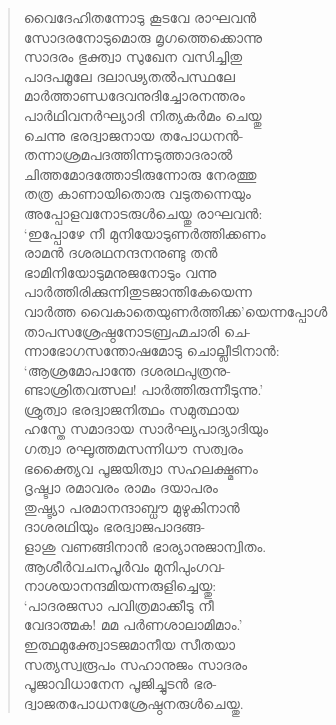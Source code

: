 \begin{verse}
വൈദേഹിതന്നോടു കൂടവേ രാഘവന്‍\\
സോദരനോടുമൊരു മൃഗത്തെക്കൊന്നു\\
സാദരം ഭുക്ത്വാ സുഖേന വസിച്ചിതു\\
പാദപമൂലേ ദലാഢ്യതല്‍പസ്ഥലേ\\
മാര്‍ത്താണ്ഡദേവനുദിച്ചോരനന്തരം\\
പാര്‍ഥിവനര്‍ഘ്യാദി നിത്യകര്‍മം ചെയ്തു\\
ചെന്നു ഭരദ്വാജനായ തപോധനന്‍-\\
തന്നാശ്രമപദത്തിന്നടുത്താദരാല്‍\\
ചിത്തമോദത്തോടിരുന്നോരു നേരത്തു\\
തത്ര കാണായിതൊരു വടുതന്നെയും\\
അപ്പോളവനോടരുള്‍ചെയ്തു രാഘവന്‍:\\
‘ഇപ്പോഴേ നീ മുനിയോടുണര്‍ത്തിക്കണം\\
രാമന്‍ ദശരഥനന്ദനനുണ്ടു തന്‍\\
ഭാമിനിയോടുമനുജനോടും വന്നു\\
പാര്‍ത്തിരിക്കുന്നിതുടജാന്തികേയെന്ന\\
വാര്‍ത്ത വൈകാതെയുണര്‍ത്തിക്ക’യെന്നപ്പോള്‍\\
താപസശ്രേഷ്ഠനോടബ്രഹ്മചാരി ചെ-\\
ന്നാഭോഗസന്തോഷമോടു ചൊല്ലീടിനാന്‍:\\
‘ആശ്രമോപാന്തേ ദശരഥപുത്രനു-\\
ണ്ടാശ്രിതവത്സല! പാര്‍ത്തിരുന്നീടുന്നു.’\\
ശ്രുത്വാ ഭരദ്വാജനിത്ഥം സമുത്ഥായ\\
ഹസ്തേ സമാദായ സാര്‍ഘ്യപാദ്യാദിയും\\
ഗത്വാ രഘൂത്തമസന്നിധൗ സത്വരം\\
ഭക്ത്യൈവ പൂജയിത്വാ സഹലക്ഷ്മണം\\
ദൃഷ്ട്വാ രമാവരം രാമം ദയാപരം\\
തുഷ്ട്യാ പരമാനന്ദാബ്ധൗ മുഴുകിനാന്‍\\
ദാശരഥിയും ഭരദ്വാജപാദങ്ങ-\\
ളാശു വണങ്ങിനാന്‍ ഭാര്യാനുജാന്വിതം.\\
ആശീര്‍വചനപൂര്‍വം മുനിപുംഗവ-\\
നാശയാനന്ദമിയന്നരുളിച്ചെയ്തു:\\
‘പാദരജസാ പവിത്രമാക്കീടു നീ\\
വേദാത്മക! മമ പര്‍ണശാലാമിമാം.’\\
ഇത്ഥമുക്ത്വോടജമാനീയ സീതയാ\\
സത്യസ്വരൂപം സഹാനുജം സാദരം\\
പൂജാവിധാനേന പൂജിച്ചുടന്‍ ഭര-\\
ദ്വാജതപോധനശ്രേഷ്ഠനരുള്‍ചെയ്തു.\\

\end{verse}
